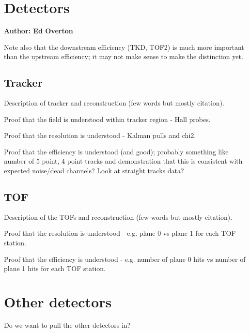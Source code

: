 \section{Detectors}
\label{Sect:Detectors}

\bf{Author: Ed Overton}

Note also that the downstream efficiency (TKD, TOF2) is much more important than 
the upstream efficiency; it may not make sense to make the distinction yet.

\subsection{Tracker}

Description of tracker and reconstruction (few words but mostly citation).

Proof that the field is understood within tracker region - Hall probes.

Proof that the resolution is understood - Kalman pulls and chi2. 

Proof that the efficiency is understood (and good); probably something like 
number of 5 point, 4 point tracks and demonstration that this is consistent with
expected noise/dead channels? Look at straight tracks data?

\subsection{TOF}

Description of the TOFs and reconstruction (few words but mostly citation).

Proof that the resolution is understood - e.g. plane 0 vs plane 1 for each TOF station.

Proof that the efficiency is understood - e.g. number of plane 0 hits vs number 
of plane 1 hits for each TOF station.

\section{Other detectors}

Do we want to pull the other detectors in?


